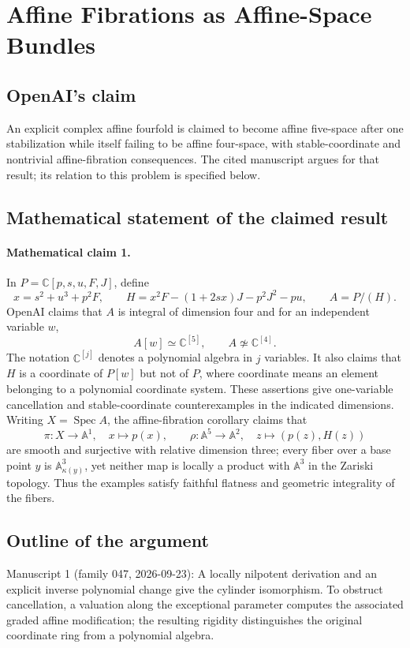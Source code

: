 \documentclass[11pt]{article}
\begin{document}
\section*{Affine Fibrations as Affine-Space Bundles}

\subsection{OpenAI's claim}
An explicit complex affine fourfold is claimed to become affine five-space after one stabilization while itself failing to be affine four-space, with stable-coordinate and nontrivial affine-fibration consequences. The cited manuscript argues for that result; its relation to this problem is specified below.

\subsection{Mathematical statement of the claimed result}
\paragraph{Mathematical claim 1.} In $P=\mathbb C[p,s,u,F,J]$, define
\[
x=s^2+u^3+p^2F,\qquad H=x^2F-(1+2sx)J-p^2J^2-pu,\qquad A=P/(H).
\]
OpenAI claims that $A$ is integral of dimension four and for an independent variable $w$,
\[
A[w]\simeq\mathbb C^{[5]},\qquad A\not\simeq\mathbb C^{[4]}.
\]
The notation $\mathbb C^{[j]}$ denotes a polynomial algebra in $j$ variables. It also claims that $H$ is a coordinate of $P[w]$ but not of $P$, where coordinate means an element belonging to a polynomial coordinate system. These assertions give one-variable cancellation and stable-coordinate counterexamples in the indicated dimensions.
Writing $X=\operatorname{Spec}A$, the affine-fibration corollary claims that
\[
\pi:X\to\mathbb A^1,\quad x\mapsto p(x),\qquad
\rho:\mathbb A^5\to\mathbb A^2,\quad z\mapsto(p(z),H(z))
\]
are smooth and surjective with relative dimension three; every fiber over a base point $y$ is $\mathbb A^3_{\kappa(y)}$, yet neither map is locally a product with $\mathbb A^3$ in the Zariski topology. Thus the examples satisfy faithful flatness and geometric integrality of the fibers.

\subsection{Outline of the argument}
Manuscript 1 (family 047, 2026-09-23): A locally nilpotent derivation and an explicit inverse polynomial change give the cylinder isomorphism. To obstruct cancellation, a valuation along the exceptional parameter computes the associated graded affine modification; the resulting rigidity distinguishes the original coordinate ring from a polynomial algebra.
\end{document}
